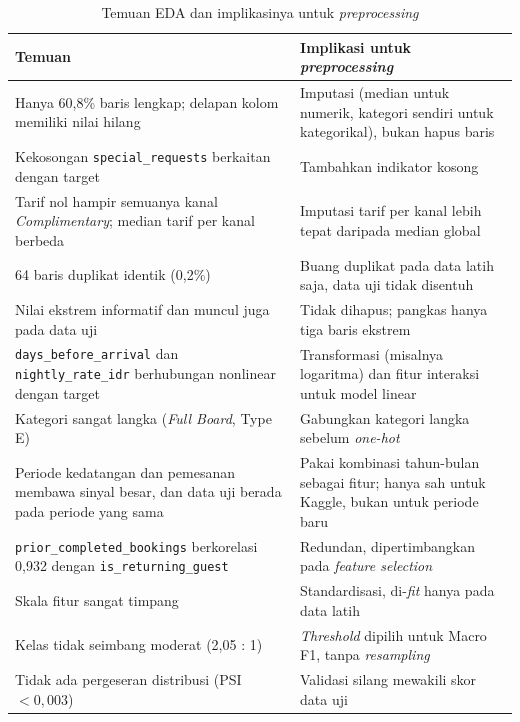 \begin{table}[H]
	\centering
	\caption{Temuan EDA dan implikasinya untuk \textit{preprocessing}}
	\label{tab:ringkasan-eda}
	\begin{tabular}{p{6.4cm} p{6.4cm}}
		\toprule
		\textbf{Temuan} & \textbf{Implikasi untuk \textit{preprocessing}} \\
		\midrule
		Hanya 60,8\% baris lengkap; delapan kolom memiliki nilai hilang & Imputasi (median untuk numerik, kategori sendiri untuk kategorikal), bukan hapus baris \\
		Kekosongan \texttt{special\_\allowbreak requests} berkaitan dengan target & Tambahkan indikator kosong \\
		Tarif nol hampir semuanya kanal \textit{Complimentary}; median tarif per kanal berbeda & Imputasi tarif per kanal lebih tepat daripada median global \\
		64 baris duplikat identik (0,2\%) & Buang duplikat pada data latih saja, data uji tidak disentuh \\
		Nilai ekstrem informatif dan muncul juga pada data uji & Tidak dihapus; pangkas hanya tiga baris ekstrem \\
		\texttt{days\_\allowbreak before\_\allowbreak arrival} dan \texttt{nightly\_\allowbreak rate\_\allowbreak idr} berhubungan nonlinear dengan target & Transformasi (misalnya logaritma) dan fitur interaksi untuk model linear \\
		Kategori sangat langka (\textit{Full Board}, Type E) & Gabungkan kategori langka sebelum \textit{one-hot} \\
		Periode kedatangan dan pemesanan membawa sinyal besar, dan data uji berada pada periode yang sama & Pakai kombinasi tahun-bulan sebagai fitur; hanya sah untuk Kaggle, bukan untuk periode baru \\
		\texttt{prior\_\allowbreak completed\_\allowbreak bookings} berkorelasi 0,932 dengan \texttt{is\_\allowbreak returning\_\allowbreak guest} & Redundan, dipertimbangkan pada \textit{feature selection} \\
		Skala fitur sangat timpang & Standardisasi, di-\textit{fit} hanya pada data latih \\
		Kelas tidak seimbang moderat (2,05 : 1) & \textit{Threshold} dipilih untuk Macro F1, tanpa \textit{resampling} \\
		Tidak ada pergeseran distribusi (PSI $< 0{,}003$) & Validasi silang mewakili skor data uji \\
		\bottomrule
	\end{tabular}
\end{table}
\endgroup
